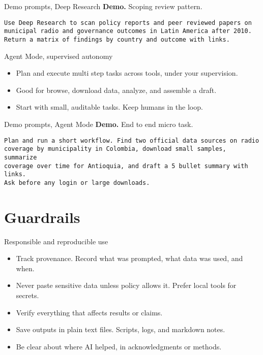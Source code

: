 \documentclass[aspectratio=169,professionalfonts]{beamer}
\newcommand{\demo}{\textbf{Demo. }}
\begin{document}
\begin{frame}[fragile]{Demo prompts, Deep Research}
\demo Scoping review pattern.
\begin{verbatim}
Use Deep Research to scan policy reports and peer reviewed papers on
municipal radio and governance outcomes in Latin America after 2010.
Return a matrix of findings by country and outcome with links.
\end{verbatim}
\end{frame}

\begin{frame}{Agent Mode, supervised autonomy}
  \begin{itemize}
    \item Plan and execute multi step tasks across tools, under your supervision.
    \item Good for browse, download data, analyze, and assemble a draft.
    \item Start with small, auditable tasks. Keep humans in the loop.
  \end{itemize}
\end{frame}

\begin{frame}[fragile]{Demo prompts, Agent Mode}
\demo End to end micro task.
\begin{verbatim}
Plan and run a short workflow. Find two official data sources on radio
coverage by municipality in Colombia, download small samples, summarize
coverage over time for Antioquia, and draft a 5 bullet summary with links.
Ask before any login or large downloads.
\end{verbatim}
\end{frame}

\section{Guardrails}

\begin{frame}{Responsible and reproducible use}
  \begin{itemize}
    \item Track provenance. Record what was prompted, what data was used, and when.
    \item Never paste sensitive data unless policy allows it. Prefer local tools for secrets.
    \item Verify everything that affects results or claims.
    \item Save outputs in plain text files. Scripts, logs, and markdown notes.
    \item Be clear about where AI helped, in acknowledgments or methods.
  \end{itemize}
\end{frame}
\end{document}

